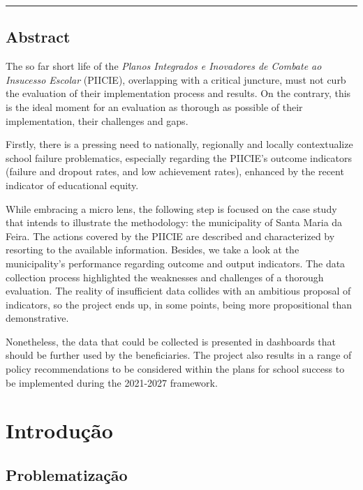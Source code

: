 \documentclass[
]{book}
\begin{document}
\begin{center}\rule{0.5\linewidth}{0.5pt}\end{center}

\hypertarget{abstract}{%
\section{\texorpdfstring{\textbf{Abstract}}{Abstract}}\label{abstract}}

The so far short life of the \emph{Planos Integrados e Inovadores de Combate ao Insucesso Escolar} (PIICIE), overlapping with a critical juncture, must not curb the evaluation of their implementation process and results. On the contrary, this is the ideal moment for an evaluation as thorough as possible of their implementation, their challenges and gaps.

Firstly, there is a pressing need to nationally, regionally and locally contextualize school failure problematics, especially regarding the PIICIE's outcome indicators (failure and dropout rates, and low achievement rates), enhanced by the recent indicator of educational equity.

While embracing a micro lens, the following step is focused on the case study that intends to illustrate the methodology: the municipality of Santa Maria da Feira. The actions covered by the PIICIE are described and characterized by resorting to the available information. Besides, we take a look at the municipality's performance regarding outcome and output indicators. The data collection process highlighted the weaknesses and challenges of a thorough evaluation. The reality of insufficient data collides with an ambitious proposal of indicators, so the project ends up, in some points, being more propositional than demonstrative.

Nonetheless, the data that could be collected is presented in dashboards that should be further used by the beneficiaries. The project also results in a range of policy recommendations to be considered within the plans for school success to be implemented during the 2021-2027 framework.

\hypertarget{introduuxe7uxe3o}{%
\chapter{Introdução}\label{introduuxe7uxe3o}}

\hypertarget{problematizauxe7uxe3o}{%
\section{Problematização}\label{problematizauxe7uxe3o}}
\end{document}
